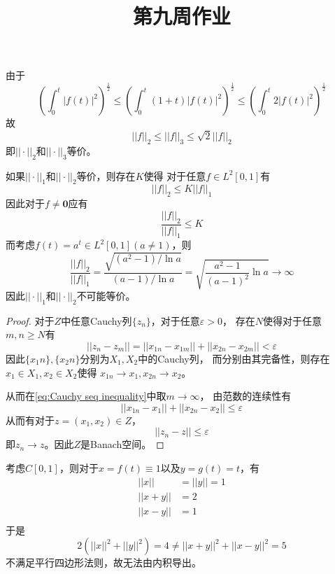 \documentclass[cn]{homework}
\title{第九周作业}
\begin{document}
    \maketitle

    \problem
    由于
    \[\left(\int_0^t|f(t)|^2\right)^{\frac{1}{2}}
    \leq
    \left(\int_0^t(1+t)|f(t)|^2\right)^{\frac{1}{2}}
    \leq
    \left(\int_0^t2|f(t)|^2\right)^{\frac{1}{2}}\]
    故
    \[||f||_2\leq||f||_3\leq\sqrt{2}||f||_2\]
    即$||\cdot||_2$和$||\cdot||_3$等价。

    如果$||\cdot||_1$和$||\cdot||_2$等价，则存在$K$使得
    对于任意$f\in L^2[0,1]$有
    \[||f||_2\leq K||f||_1\]
    因此对于$f\neq \boldsymbol 0$应有
    \[\frac{||f||_2}{||f||_1}\leq K\]
    而考虑$f(t)=a^t\in L^2[0,1](a\neq 1)$，则
    \[\frac{||f||_2}{||f||_1}
    =\frac{\sqrt{(a^2-1)/\ln a}}{(a-1)/\ln a}
    =\sqrt{\frac{a^2-1}{(a-1)^2}\ln a}\to\infty\]
    因此$||\cdot||_1$和$||\cdot||_2$不可能等价。

    \problem
    \begin{proof}
        对于$Z$中任意Cauchy列$\{z_n\}$，对于任意$\varepsilon>0$，
        存在$N$使得对于任意$m,n\geq N$有
        \begin{equation}
            \label{eq:Cauchy seq inequality}
            ||z_n-z_m||=||x_{1n}-x_{1m}||+||x_{2n}-x_{2m}||
            <\varepsilon
        \end{equation}
        因此$\{x_1n\},\{x_2n\}$分别为$X_1,X_2$中的Cauchy列，
        而分别由其完备性，则存在$x_1\in X_1,x_2\in X_2$使得
        $x_{1n}\to x_1,x_{2n}\to x_2$。

        从而在\cref{eq:Cauchy seq inequality}中取$m\to\infty$，
        由范数的连续性有
        \[||x_{1n}-x_1||+||x_{2n}-x_2||\leq\varepsilon\]
        从而有对于$z=(x_1,x_2)\in Z$，
        \[||z_n-z||\leq\varepsilon\]
        即$z_n\to z$。因此$Z$是Banach空间。
    \end{proof}

    \problem
    考虑$C[0,1]$，则对于$x=f(t)\equiv 1$以及$y=g(t)=t$，有
    \[\begin{aligned}
        ||x||&=||y||=1\\
        ||x+y||&=2\\
        ||x-y||&=1\\
    \end{aligned}\]
    于是
    \[2(||x||^2+||y||^2)=4\neq ||x+y||^2+||x-y||^2=5\]
    不满足平行四边形法则，故无法由内积导出。
\end{document}
